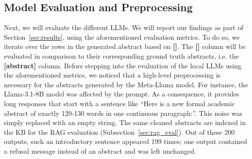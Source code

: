 \documentclass[bdcc,article,submit,pdftex,moreauthors]{Definitions/mdpi}
\begin{document}
\subsection{Model Evaluation and Preprocessing}
\label{subsec:eval}


Next, we will evaluate the different LLMs. We will report our findings as part of Section~\ref{sec:results}, using the aforementioned evaluation metrics. To do so, we iterate over the rows in the generated abstract based on \textbf{[]}. The \textbf{[]} column will be evaluated in comparison to their corresponding ground truth abstracts, i.e. the \textbf{[abstract]} column. Before stepping into the evaluation of the local LLMs using the aforementioned metrics, we noticed that a high-level preprocessing is necessary for the abstracts generated by the Meta-Llama model. For instance, the Llama-3.1-8B model was affected by the prompt. As a consequence, it provides long responses that start with a sentence like ``Here is a new formal academic abstract of exactly 120-130 words in one continuous paragraph:''. This noise was simply replaced with an empty string. %
The same cleaned abstracts are indexed in the KB for the RAG evaluation (Subsection~\ref{sec:rag_eval}). Out of these 200 outputs, such an introductory sentence appeared 199 times; one output contained a refusal message instead of an abstract and was left unchanged.

\end{document}
